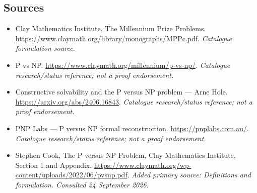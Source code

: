 \documentclass[11pt]{article}
\begin{document}
\subsection{Sources}
\begin{itemize}\raggedright
\item[\textnormal{[S1]}]\hypertarget{source:1:1}{} Clay Mathematics Institute, The Millennium Prize Problems.
\url{https://www.claymath.org/library/monographs/MPPc.pdf}.
{\small\textit{Catalogue formulation source.}}
\item[\textnormal{[S2]}]\hypertarget{source:1:2}{} P vs NP.
\url{https://www.claymath.org/millennium/p-vs-np/}.
{\small\textit{Catalogue research/status reference; not a proof endorsement.}}
\item[\textnormal{[S3]}]\hypertarget{source:1:3}{} Constructive solvability and the P versus NP problem — Arne Hole.
\url{https://arxiv.org/abs/2406.16843}.
{\small\textit{Catalogue research/status reference; not a proof endorsement.}}
\item[\textnormal{[S4]}]\hypertarget{source:1:4}{} PNP Labs — P versus NP formal reconstruction.
\url{https://pnplabs.com.au/}.
{\small\textit{Catalogue research/status reference; not a proof endorsement.}}
\item[\textnormal{[E1]}]\hypertarget{extra:1:1}{} Stephen Cook, The P versus NP Problem, Clay Mathematics Institute, Section 1 and Appendix.
\url{https://www.claymath.org/wp-content/uploads/2022/06/pvsnp.pdf}.
{\small\textit{Added primary source: Definitions and formulation. Consulted 24 September 2026.}}


\end{itemize}
\end{document}
